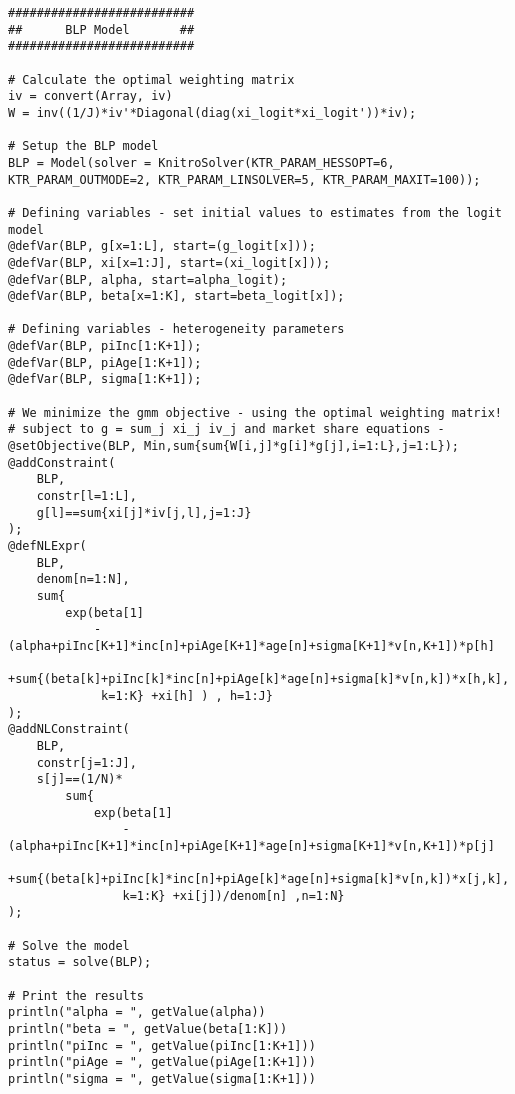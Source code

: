 \documentclass[a4paper,11pt]{article}
\begin{document}
{\begin{lstlisting}
##########################
##      BLP Model       ##
##########################

# Calculate the optimal weighting matrix
iv = convert(Array, iv)
W = inv((1/J)*iv'*Diagonal(diag(xi_logit*xi_logit'))*iv);

# Setup the BLP model
BLP = Model(solver = KnitroSolver(KTR_PARAM_HESSOPT=6, 
KTR_PARAM_OUTMODE=2, KTR_PARAM_LINSOLVER=5, KTR_PARAM_MAXIT=100));

# Defining variables - set initial values to estimates from the logit model
@defVar(BLP, g[x=1:L], start=(g_logit[x]));
@defVar(BLP, xi[x=1:J], start=(xi_logit[x]));
@defVar(BLP, alpha, start=alpha_logit);
@defVar(BLP, beta[x=1:K], start=beta_logit[x]);

# Defining variables - heterogeneity parameters
@defVar(BLP, piInc[1:K+1]);
@defVar(BLP, piAge[1:K+1]);
@defVar(BLP, sigma[1:K+1]);

# We minimize the gmm objective - using the optimal weighting matrix! 
# subject to g = sum_j xi_j iv_j and market share equations - 
@setObjective(BLP, Min,sum{sum{W[i,j]*g[i]*g[j],i=1:L},j=1:L});
@addConstraint(
    BLP, 
    constr[l=1:L], 
    g[l]==sum{xi[j]*iv[j,l],j=1:J}
);
@defNLExpr(
    BLP,
    denom[n=1:N],
    sum{
        exp(beta[1]
            -(alpha+piInc[K+1]*inc[n]+piAge[K+1]*age[n]+sigma[K+1]*v[n,K+1])*p[h]
            +sum{(beta[k]+piInc[k]*inc[n]+piAge[k]*age[n]+sigma[k]*v[n,k])*x[h,k],
             k=1:K} +xi[h] ) , h=1:J}
);
@addNLConstraint(
    BLP,
    constr[j=1:J], 
    s[j]==(1/N)*
        sum{
            exp(beta[1]
                -(alpha+piInc[K+1]*inc[n]+piAge[K+1]*age[n]+sigma[K+1]*v[n,K+1])*p[j]
                 +sum{(beta[k]+piInc[k]*inc[n]+piAge[k]*age[n]+sigma[k]*v[n,k])*x[j,k],
                k=1:K} +xi[j])/denom[n] ,n=1:N}
);

# Solve the model
status = solve(BLP);

# Print the results
println("alpha = ", getValue(alpha))
println("beta = ", getValue(beta[1:K]))
println("piInc = ", getValue(piInc[1:K+1]))
println("piAge = ", getValue(piAge[1:K+1]))
println("sigma = ", getValue(sigma[1:K+1]))
\end{lstlisting}}
\end{document}
